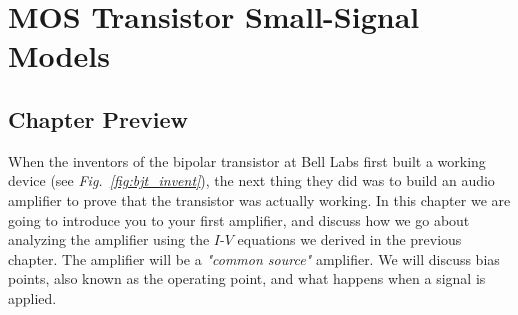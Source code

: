 \chapter{MOS Transistor Small-Signal Models}
\label{ch:ch09_mos_ss_dc}
\graphicspath{{./figs_mos_ss_dc/}}
\section{Chapter Preview}
When the inventors of the bipolar transistor at Bell Labs first built a working device (see \emph{Fig.~\ref{fig:bjt_invent}}), the next thing they did was to build an audio amplifier to prove that the transistor was actually working.  In this chapter we are going to introduce you to your first amplifier, and discuss how we go about analyzing the amplifier using the $I$-$V$ equations we derived in the previous chapter.  The amplifier will be a \emph{"common source"} amplifier.  We will discuss bias points, also known as the operating point, and what happens when a signal is applied.

